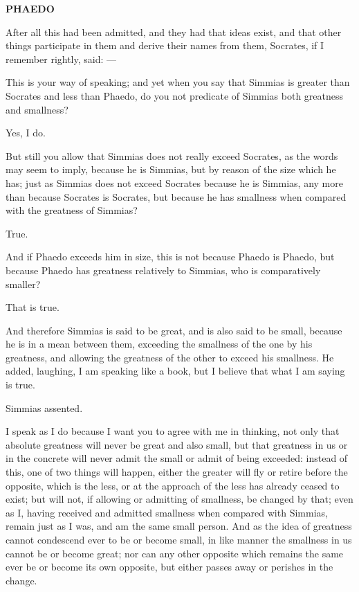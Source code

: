\documentclass[11pt,letter]{article}
\begin{document}
\par \textbf{PHAEDO}
\par   After all this had been admitted, and they had that ideas exist, and that other things participate in them and derive their names from them, Socrates, if I remember rightly, said: —

\par  This is your way of speaking; and yet when you say that Simmias is greater than Socrates and less than Phaedo, do you not predicate of Simmias both greatness and smallness?

\par  Yes, I do.

\par  But still you allow that Simmias does not really exceed Socrates, as the words may seem to imply, because he is Simmias, but by reason of the size which he has; just as Simmias does not exceed Socrates because he is Simmias, any more than because Socrates is Socrates, but because he has smallness when compared with the greatness of Simmias?

\par  True.

\par  And if Phaedo exceeds him in size, this is not because Phaedo is Phaedo, but because Phaedo has greatness relatively to Simmias, who is comparatively smaller?

\par  That is true.

\par  And therefore Simmias is said to be great, and is also said to be small, because he is in a mean between them, exceeding the smallness of the one by his greatness, and allowing the greatness of the other to exceed his smallness. He added, laughing, I am speaking like a book, but I believe that what I am saying is true.

\par  Simmias assented.

\par  I speak as I do because I want you to agree with me in thinking, not only that absolute greatness will never be great and also small, but that greatness in us or in the concrete will never admit the small or admit of being exceeded: instead of this, one of two things will happen, either the greater will fly or retire before the opposite, which is the less, or at the approach of the less has already ceased to exist; but will not, if allowing or admitting of smallness, be changed by that; even as I, having received and admitted smallness when compared with Simmias, remain just as I was, and am the same small person. And as the idea of greatness cannot condescend ever to be or become small, in like manner the smallness in us cannot be or become great; nor can any other opposite which remains the same ever be or become its own opposite, but either passes away or perishes in the change.
\end{document}
